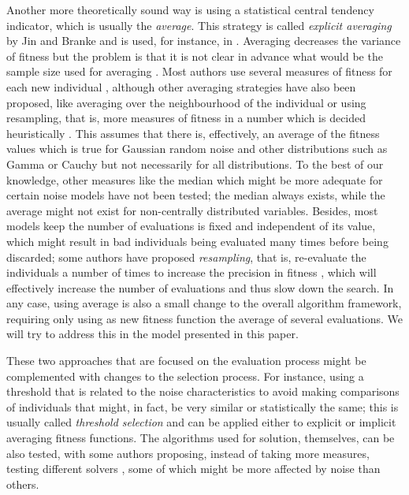 \documentclass{llncs}
\begin{document}
Another more theoretically sound way is using a statistical central tendency
indicator, which is usually the {\em average}. This strategy is called
{\em explicit averaging} by Jin and Branke and is used, for instance,
in 
\cite{Junhua20136780}. Averaging decreases the variance of fitness but
the problem is that it is not clear in advance what would be the
sample size used for averaging \cite{aizawa1994scheduling}. Most
authors use several measures of fitness for each new individual
\cite{costa2013using}, although other averaging strategies have also
been proposed, like averaging over the neighbourhood of the
individual or using resampling, that is, more measures of fitness in a
number which is decided heuristically \cite{liu2014mathematically}. This assumes that there is, effectively, an average of the
fitness values which is true for Gaussian random noise and other
distributions such as Gamma or Cauchy but not
necessarily for all distributions. 
To the best of our knowledge, 
other measures like the median which might be more adequate for
certain noise models have not been tested; the median always exists, while the average might not exist for non-centrally distributed variables. Besides, most models keep the number of evaluations is fixed
and independent of its value, 
which might result in bad individuals
being evaluated many times before being discarded; some authors have
proposed {\em resampling}, that is, re-evaluate the individuals a number of times to increase the precision in fitness
\cite{RadaVilela2014}, 
which will effectively increase the number of
evaluations and thus slow down the search. In any case, using average is
also a small change to the overall algorithm framework, requiring only
using as new fitness function the average of several evaluations.
We will try to address this in the model presented in this
paper. 

These two approaches that are focused on the evaluation process might
be complemented with changes to the selection process. For instance,
using a threshold \cite{Rudolph2001318} that is related to the noise characteristics to
avoid making comparisons of individuals that might, in fact, be very
similar or statistically the same; this is usually called {\em
  threshold selection} and can be applied either to explicit or
implicit averaging fitness functions. The algorithms used for
solution, themselves, can be also tested, with some authors proposing, instead of taking more measures, 
testing different solvers \cite{cauwet2014algorithm}, some of which
might be more affected by noise than others. 
\end{document}
